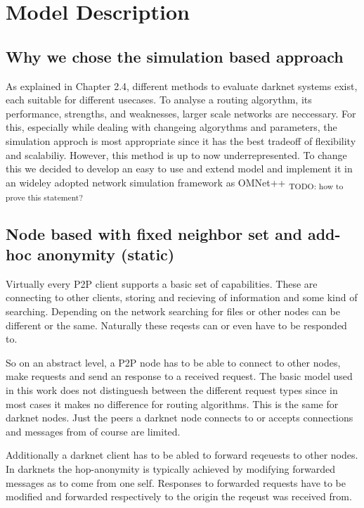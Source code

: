 \chapter{Model Description}

\section{Why we chose the simulation based approach}

As explained in Chapter 2.4, different methods to evaluate darknet systems exist, each suitable for different usecases. To analyse a routing algorythm, its performance, strengths, and weaknesses, larger scale networks are neccessary. For this, especially while dealing with changeing algorythms and parameters, the simulation approch is most appropriate since it has the best tradeoff of flexibility and scalabiliy. However, this method is up to now underrepresented. To change this we decided to develop an easy to use and extend model and implement it in an wideley adopted network simulation framework as OMNet++ \textsubscript{TODO: how to prove this statement?}

\section{Node based with fixed neighbor set and add-hoc anonymity (static)}

Virtually every P2P client supports a basic set of capabilities. These are connecting to other clients, storing and recieving of information and some kind of searching. Depending on the network searching for files or other nodes can be different or the same. Naturally these reqests can or even have to be responded to.

So on an abstract level, a P2P node has to be able to connect to other nodes, make requests and send an response to a received request. The basic model used in this work does not distinguesh between the different request types since in most cases it makes no difference for routing algorithms. This is the same for darknet nodes. Just the peers a darknet node connects to or accepts connections and messages from of course are limited.

Additionally a darknet client has to be abled to forward reqeuests to other nodes. In darknets the hop-anonymity is typically achieved by modifying forwarded messages as to come from one self. Responses to forwarded requests have to be modified and forwarded respectively to the origin the reqeust was received from.

